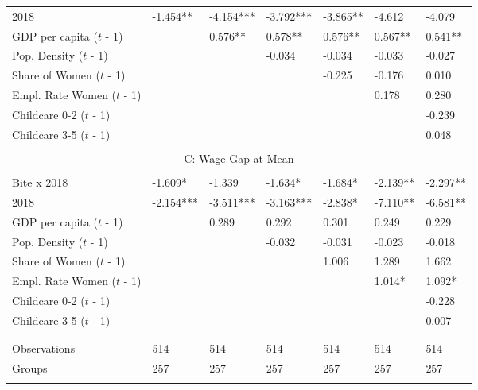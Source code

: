 \documentclass[12pt,draft,a4paper]{article}
\begin{document}
\begin{table}[btp]
{\begin{tabular}{lllllll}
    2018                      & -1.454**  & -4.154*** & -3.792*** & -3.865**  & -4.612    & -4.079    \\
    GDP per capita ($t$ - 1)   &           & 0.576**   & 0.578**   & 0.576**   & 0.567**   & 0.541**   \\
    Pop. Density ($t$ - 1)     &           &           & -0.034    & -0.034    & -0.033    & -0.027    \\
    Share of Women ($t$ - 1)   &           &           &           & -0.225    & -0.176    & 0.010     \\
    Empl. Rate Women ($t$ - 1) &           &           &           &           & 0.178     & 0.280     \\
    Childcare 0-2 ($t$ - 1)    &           &           &           &           &           & -0.239    \\
    Childcare 3-5 ($t$ - 1)    &           &           &           &           &           & 0.048     \\ 
    \hline & \\[-1.0em]
    \multicolumn{7}{c}{C: Wage Gap at Mean}                                                           \\ 
    \hline & \\[-1.0em]
    Bite x 2018               & -1.609*   & -1.339    & -1.634*   & -1.684*   & -2.139**  & -2.297**  \\
    2018                      & -2.154*** & -3.511*** & -3.163*** & -2.838*   & -7.110**  & -6.581**  \\
    GDP per capita ($t$ - 1)   &           & 0.289     & 0.292     & 0.301     & 0.249     & 0.229     \\
    Pop. Density ($t$ - 1)     &           &           & -0.032    & -0.031    & -0.023    & -0.018    \\
    Share of Women ($t$ - 1)   &           &           &           & 1.006     & 1.289     & 1.662     \\
    Empl. Rate Women ($t$ - 1) &           &           &           &           & 1.014*    & 1.092*    \\
    Childcare 0-2 ($t$ - 1)    &           &           &           &           &           & -0.228    \\
    Childcare 3-5 ($t$ - 1)    &           &           &           &           &           & 0.007     \\ 
    & \\[-1.0em]
    \hline & \\[-1.0em]
    Observations              & 514       & 514       & 514       & 514       & 514       & 514       \\
    Groups                    & 257       & 257       & 257       & 257       & 257       & 257       \\
    \hline & \\[-1.0em]
    \end{tabular}
    
}
\end{table}
\end{document}

